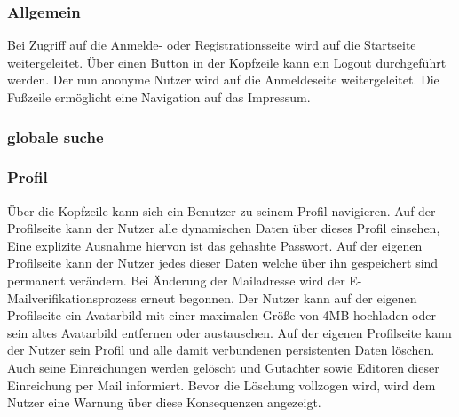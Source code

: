 \subsubsection{Allgemein}
\begin{description}
     Bei Zugriff auf die Anmelde- oder Registrationsseite
    wird auf die Startseite weitergeleitet.
     Über einen Button in der Kopfzeile kann ein Logout durchgeführt werden.
    Der nun anonyme Nutzer wird auf die Anmeldeseite weitergeleitet.
     Die Fußzeile ermöglicht eine Navigation auf das Impressum.
\end{description}

\subsubsection{globale suche}

\subsubsection{Profil}
\begin{description}
    \XXitem{} Über die Kopfzeile kann sich ein Benutzer zu seinem Profil navigieren.
    \XXitem{} Auf der Profilseite kann der Nutzer alle dynamischen Daten über dieses Profil einsehen,
    Eine explizite Ausnahme hiervon ist das gehashte Passwort. %
     Auf der eigenen Profilseite kann der Nutzer jedes dieser Daten %
    welche über ihn gespeichert sind permanent verändern.
     Bei Änderung der Mailadresse wird der E-Mailverifikationsprozess erneut
    begonnen. %
    \XXitem{} Der Nutzer kann auf der eigenen Profilseite ein Avatarbild mit einer maximalen
    Größe von 4MB hochladen oder sein altes Avatarbild entfernen oder austauschen. %
    \XXitem{} Auf der eigenen Profilseite kann der Nutzer sein Profil und alle damit verbundenen persistenten
    Daten löschen. Auch seine Einreichungen werden gelöscht und Gutachter sowie Editoren dieser
    Einreichung per Mail informiert. Bevor die Löschung vollzogen wird, wird dem Nutzer
    eine Warnung über diese Konsequenzen angezeigt.
\end{description}

